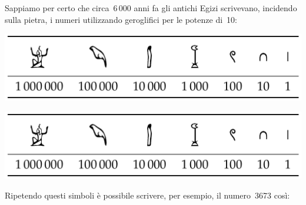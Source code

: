 Sappiamo per certo che circa~6\,000 anni fa gli antichi Egizi scrivevano, 
incidendo sulla pietra, i numeri utilizzando geroglifici per le potenze 
di~10:

\ifdefined\HCode                          %
\begin{inaccessibleblock}
\begin{center} 
\includegraphics[scale=1]{img/hieropotdieci.png} 
\end{center}
\end{inaccessibleblock}
\else
\begin{inaccessibleblock}
\vspace{-2ex}
\begin{center} 
\includegraphics[scale=0.28]{img/hieropotdieci.png} 
\end{center}
\vspace{-2ex}
\end{inaccessibleblock}
\fi

Ripetendo questi simboli è possibile scrivere, per esempio, il numero~3673 
così:

